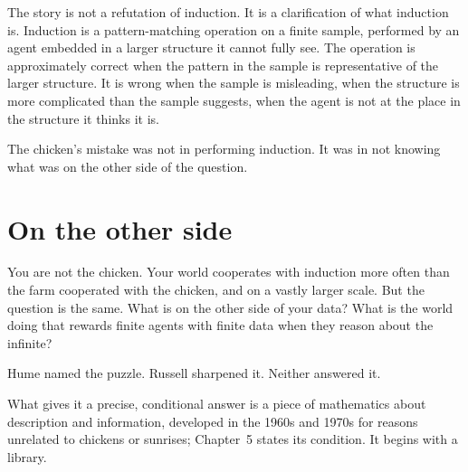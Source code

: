 The story is not a refutation of induction. It is a clarification of what induction is. Induction is a pattern-matching operation on a finite sample, performed by an agent embedded in a larger structure it cannot fully see. The operation is approximately correct when the pattern in the sample is representative of the larger structure. It is wrong when the sample is misleading, when the structure is more complicated than the sample suggests, when the agent is not at the place in the structure it thinks it is.

The chicken's mistake was not in performing induction. It was in not knowing what was on the other side of the question.

\section*{On the other side}

You are not the chicken. Your world cooperates with induction more often than the farm cooperated with the chicken, and on a vastly larger scale. But the question is the same. What is on the other side of your data? What is the world doing that rewards finite agents with finite data when they reason about the infinite?

Hume named the puzzle. Russell sharpened it. Neither answered it.

What gives it a precise, conditional answer is a piece of mathematics about description and information, developed in the 1960s and 1970s for reasons unrelated to chickens or sunrises; Chapter~5 states its condition. It begins with a library.
